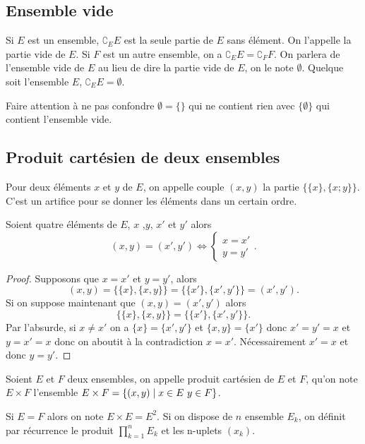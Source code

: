 \subsection{Ensemble vide}
\label{chap3-subsec:ensemblevide}
Si \(E\) est un ensemble, \(\complement_E E\) est la seule partie de \(E\) sans 
élément. On l'appelle la partie vide de \(E\). Si \(F\) est un autre ensemble, 
on a \(\complement_E E = \complement_F F\). On parlera de l'ensemble vide de 
\(E\) au lieu de dire la partie vide de \(E\), on le note \(\emptyset\). Quelque 
soit l'ensemble \(E\), \(\complement_E E =\emptyset\).

Faire attention à ne pas confondre \(\emptyset = \{\}\) qui ne contient rien 
avec \(\{\emptyset\}\) qui contient l'ensemble vide.

\subsection{Produit cartésien de deux ensembles}
\label{chap3-subsec:prodcart}
\begin{defdef}
    Pour deux éléments \(x\) et \(y\) de \(E\), on appelle couple \((x,y)\) la 
    partie \(\{\{x\},\{x;y\}\}\). C'est un artifice pour se donner les éléments dans 
    un certain ordre.
\end{defdef}
%
\begin{prop}
    Soient quatre éléments de \(E\), \(x\) ,\(y\), \(x'\) et \(y'\) alors 
    \begin{equation} 
        (x,y)=(x',y') \iff \begin{cases} x=x' \\ y=y' \end{cases}.
    \end{equation}
\end{prop}
\begin{proof}
    Supposons que \(x=x'\) et \(y=y'\), alors 
    \begin{equation}
        (x,y)=\{\{x\},\{x,y\}\}=\{\{x'\},\{x',y'\}\}=(x',y').
    \end{equation}
    Si on suppose maintenant que \((x,y)=(x',y')\) alors 
    \begin{equation}
        \{\{x\},\{x,y\}\}=\{\{x'\},\{x',y'\}\}.
    \end{equation}
    Par l'absurde, si \(x \neq x'\) on a \(\{x\}=\{x',y'\}\) et \(\{x,y\} = \{x'\}\) 
    donc \(x'=y'=x\) et \(y=x'=x\) donc on aboutit à la contradiction \(x=x'\). 
    Nécessairement \(x'=x\) et donc \(y=y'\).
\end{proof}
%
\begin{defdef}
    Soient \(E\) et \(F\) deux ensembles, on appelle produit cartésien de \(E\) et 
    \(F\), qu'on note \(E \times F\) l'ensemble $E \times F = \left\{(x,y)\mathrel{}\middle|\mathrel{}x \in E 
    \ y \in F\right\}$.
\end{defdef}
Si \(E=F\) alors on note \(E \times E=E^2\). Si on dispose de \(n\) ensemble 
\(E_k\), on définit par récurrence le produit \(\prod_{k=1}^n E_k\) et les 
n-uplets \((x_k)\).

